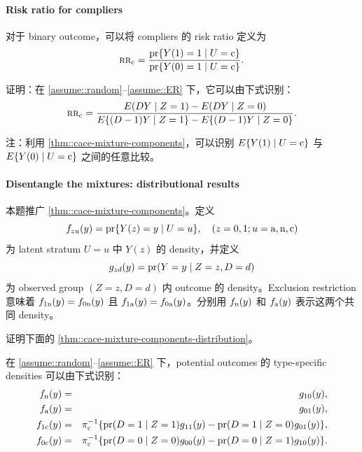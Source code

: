 \paragraph{Risk ratio for compliers}\label{hw::rr-compliers}


对于 binary outcome，可以将 compliers 的 risk ratio 定义为
$$
\textsc{rr}_{\textup{c}} = \frac{  \textup{pr}\{  Y(1) = 1\mid U = \textup{c} \}  }{ \textup{pr}\{  Y(0) = 1\mid U = \textup{c} \}   } .
$$

证明：在 \cref{assume::random}--\cref{assume::ER} 下，它可以由下式识别：
$$
\textsc{rr}_{\textup{c}} =  \frac{  E(DY\mid Z=1)  - E(DY\mid Z=0)  }{  E\{  (D-1)Y\mid Z=1 \}   - E\{ (D-1)Y\mid Z=0 \} }.
$$



注：利用 \cref{thm::cace-mixture-components}，可以识别 $E\{  Y(1) \mid U = \textup{c} \} $ 与 $E\{  Y(0) \mid U = \textup{c} \} $ 之间的任意比较。


\paragraph{Disentangle the mixtures: distributional results}\label{hw::disentangle-mixture-distrubution}


本题推广 \cref{thm::cace-mixture-components}。定义
$$
f_{zu}(y) = \textup{pr}\{  Y(z) = y  \mid U=u \},  \quad  (z=0,1;u=\textup{a}, \textup{n}, \textup{c})
$$
为 latent stratum $U=u$ 中 $Y(z)$ 的 density，并定义
$$
g_{zd}(y) = \textup{pr}(Y = y\mid Z=z, D=d)
$$
为 observed group $(Z=z, D=d)$ 内 outcome 的 density。Exclusion restriction 意味着 $f_{1\textup{n}}(y) = f_{0\textup{n}} (y) $ 且 $f_{1\textup{a}}(y) = f_{0\textup{a}}(y) $。分别用 $f_{\textup{n}}(y)$ 和 $ f_{\textup{a}} (y) $ 表示这两个共同 density。



证明下面的 \cref{thm::cace-mixture-components-distribution}。


 
\begin{theorem}
\label{thm::cace-mixture-components-distribution}
在 \cref{assume::random}--\cref{assume::ER} 下，potential outcomes 的 type-specific densities 可以由下式识别：
\begin{eqnarray*}
  f_{\textup{n}}(y) &=& g_{10}(y) ,\\
  f_{\textup{a}} (y) &=& g_{01}(y),\\
f_{1\textup{c}}(y) &=& \pi_{\textup{c}}^{-1} \{   \textup{pr}(D=1\mid Z=1 )g_{11}(y)  -  \textup{pr}(D=1\mid Z=0) g_{01}(y)   \} , \\
f_{0\textup{c}} (y) &=& \pi_{\textup{c}}^{-1} \{  \textup{pr}(D=0\mid Z=0)  g_{00}(y)  -  \textup{pr}(D=0\mid Z=1)  g_{10}(y)    \} . 
\end{eqnarray*}
\end{theorem}



